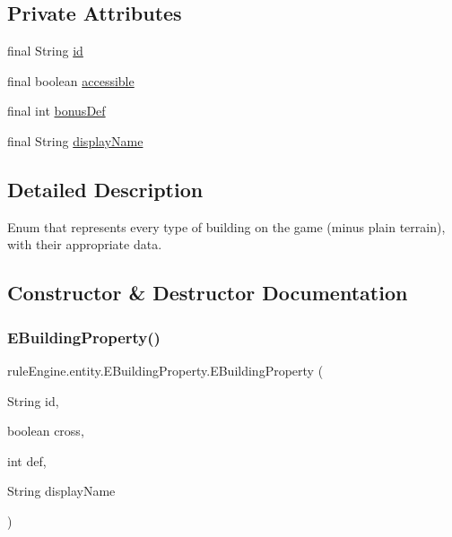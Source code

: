 \subsection*{Private Attributes}
\begin{DoxyCompactItemize}
\item 
final String \mbox{\hyperlink{enumrule_engine_1_1entity_1_1_e_building_property_aa10b24a146f5589f5a5715dc1753b37d}{id}}
\item 
final boolean \mbox{\hyperlink{enumrule_engine_1_1entity_1_1_e_building_property_a56ad77359b4e158ccd3bbc355a3f5720}{accessible}}
\item 
final int \mbox{\hyperlink{enumrule_engine_1_1entity_1_1_e_building_property_abc9db20834303d87ca24e0af7b654c87}{bonus\+Def}}
\item 
final String \mbox{\hyperlink{enumrule_engine_1_1entity_1_1_e_building_property_abcbd4fa6897a37886fd0f92e7d322e91}{display\+Name}}
\end{DoxyCompactItemize}


\subsection{Detailed Description}
Enum that represents every type of building on the game (minus plain terrain), with their appropriate data. 

\subsection{Constructor \& Destructor Documentation}
\mbox{\label{enumrule_engine_1_1entity_1_1_e_building_property_a41fd1926953e0d723daf32d31a36a987}} 
\subsubsection{\texorpdfstring{E\+Building\+Property()}{EBuildingProperty()}}
{\footnotesize\ttfamily rule\+Engine.\+entity.\+E\+Building\+Property.\+E\+Building\+Property (\begin{DoxyParamCaption}\item[{String}]{id,  }\item[{boolean}]{cross,  }\item[{int}]{def,  }\item[{String}]{display\+Name }\end{DoxyParamCaption})\hspace{0.3cm}{\ttfamily [inline]}}



